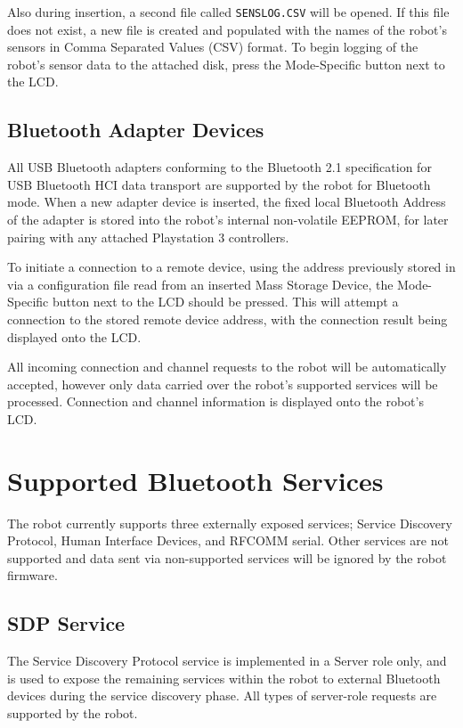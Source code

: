 Also during insertion, a second file called \texttt{SENSLOG.CSV} will be opened. If this file does not exist, a new file is created and populated with the names of the robot's sensors in Comma Separated Values (CSV) format. To begin logging of the robot's sensor data to the attached disk, press the Mode-Specific button next to the LCD.

\subsection{Bluetooth Adapter Devices}

All USB Bluetooth adapters conforming to the Bluetooth 2.1 specification for USB Bluetooth HCI data transport are supported by the robot for Bluetooth mode. When a new adapter device is inserted, the fixed local Bluetooth Address of the adapter is stored into the robot's internal non-volatile EEPROM, for later pairing with any attached Playstation 3 controllers.

To initiate a connection to a remote device, using the address previously stored in via a configuration file read from an inserted Mass Storage Device, the Mode-Specific button next to the LCD should be pressed. This will attempt a connection to the stored remote device address, with the connection result being displayed onto the LCD.

All incoming connection and channel requests to the robot will be automatically accepted, however only data carried over the robot's supported services will be processed. Connection and channel information is displayed onto the robot's LCD.

\section{Supported Bluetooth Services}

The robot currently supports three externally exposed services; Service Discovery Protocol, Human Interface Devices, and RFCOMM serial. Other services are not supported and data sent via non-supported services will be ignored by the robot firmware.

\subsection{SDP Service}

The Service Discovery Protocol service is implemented in a Server role only, and is used to expose the remaining services within the robot to external Bluetooth devices during the service discovery phase. All types of server-role requests are supported by the robot.

